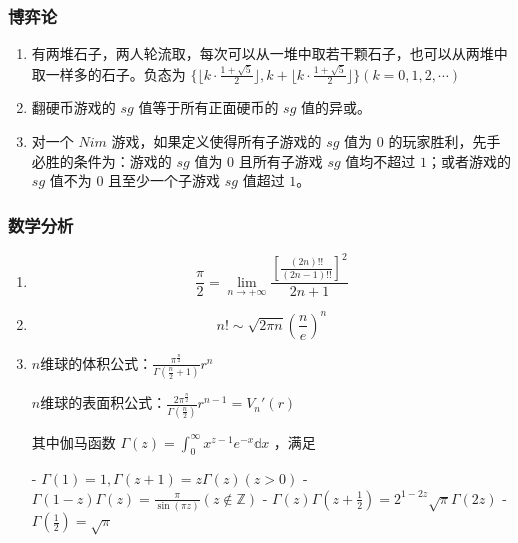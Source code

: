 \subsubsection{博弈论}

\begin{enumerate}

\item 有两堆石子，两人轮流取，每次可以从一堆中取若干颗石子，也可以从两堆中取一样多的石子。负态为 $\{\lfloor k\cdot\frac{1+\sqrt{5}}{2}\rfloor, k+\lfloor k\cdot\frac{1+\sqrt{5}}{2}\rfloor\}(k = 0,1,2,\cdots)$

\item 翻硬币游戏的 $sg$ 值等于所有正面硬币的 $sg$ 值的异或。

\item 对一个 $Nim$ 游戏，如果定义使得所有子游戏的 $sg$ 值为 $0$ 的玩家胜利，先手必胜的条件为：游戏的 $sg$ 值为 $0$ 且所有子游戏 $sg$ 值均不超过 $1$；或者游戏的 $sg$ 值不为 $0$ 且至少一个子游戏 $sg$ 值超过 $1$。

\end{enumerate}

\subsubsection{数学分析}

\begin{enumerate}

\item

$$
\frac{\pi}{2} = \lim_{n \to +\infty}\frac{[\frac{(2n)!!}{(2n-1)!!}]^{2}}{2n+1}
$$

\item

$$
n!\sim\sqrt{2\pi n}(\frac{n}{e})^{n}
$$

\item $n$维球的体积公式：$\displaystyle{\frac{\pi^{\frac{n}{2}}}{\Gamma(\frac{n}{2}+1)}r^{n}}$

$n$维球的表面积公式：$\displaystyle{\frac{2\pi^{\frac{n}{2}}}{\Gamma(\frac{n}{2})}r^{n-1}=V_{n}'(r)}$

其中伽马函数 $\Gamma(z)=\int_{0}^{\infty}x^{z-1}e^{-x}\mathbb{d}x$ ，满足

 - $\Gamma(1)=1,\Gamma(z+1)=z\Gamma(z)(z>0)$
 - $\Gamma(1-z)\Gamma(z)=\frac{\pi}{\sin(\pi z)}(z\notin\mathbb{Z})$
 - $\Gamma(z)\Gamma(z+\frac{1}{2})=2^{1-2z}\sqrt{\pi}\Gamma(2z)$
 - $\Gamma(\frac{1}{2})=\sqrt{\pi}$

\end{enumerate}

